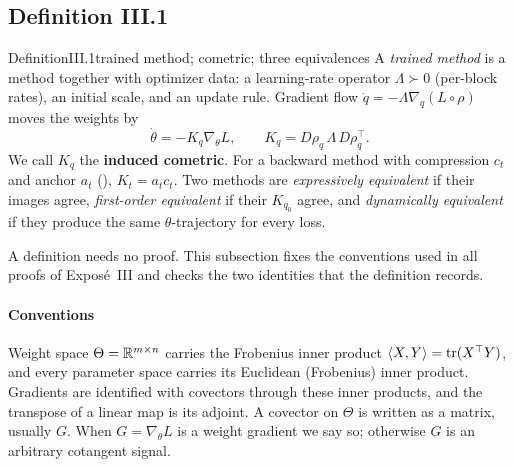 
\subsection{Definition III.1}\label{proof:III.1}

\begin{restate}{Definition}{III.1}{trained method; cometric; three equivalences}
A \emph{trained method} is a method together with optimizer data: a learning-rate operator $\Lambda\succ0$ (per-block
rates), an initial scale, and an update rule. Gradient flow $\dot q=-\Lambda\nabla_q(L\circ\rho)$ moves the weights by
\[\dot\theta=-K_q\nabla_\theta L,\qquad K_q=D\rho_q\,\Lambda\,D\rho_q^\top.\]
We call $K_q$ the \textbf{induced cometric}. For a backward method with compression $c_t$ and anchor $a_t$
(), $K_t=a_tc_t$. Two methods are \emph{expressively equivalent} if their images agree,
\emph{first-order equivalent} if their $K_{q_0}$ agree, and \emph{dynamically equivalent} if they produce the same
$\theta$-trajectory for every loss.
\end{restate}

A definition needs no proof. This subsection fixes the conventions used in all proofs of Exposé~III and checks the two
identities that the definition records.

\paragraph{Conventions}
Weight space $\Theta=\mathbb{R}^{m\times n}$ carries the Frobenius inner product $\langle X,Y\rangle=\operatorname{tr}(X^\top Y)$, and every
parameter space carries its Euclidean (Frobenius) inner product. Gradients are identified with covectors through these
inner products, and the transpose of a linear map is its adjoint. A covector on $\Theta$ is written as a matrix, usually
$G$. When $G=\nabla_\theta L$ is a weight gradient we say so; otherwise $G$ is an arbitrary cotangent signal.

